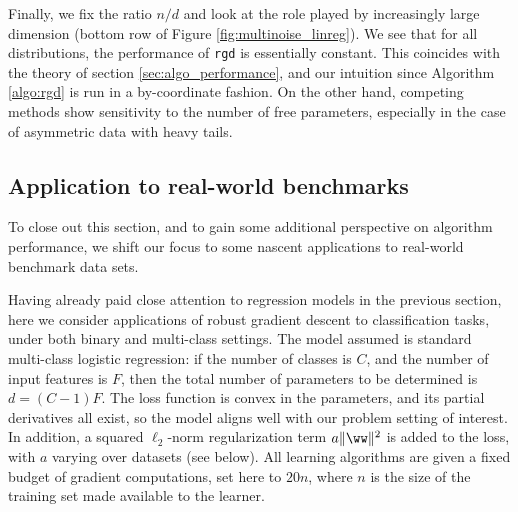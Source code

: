 \documentclass[11pt,oneside]{article}
\theoremstyle{definition} \newtheorem{defn}{Definition}       %
\theoremstyle{plain} \newtheorem{prop}[defn]{Proposition}           %
\theoremstyle{plain} \newtheorem{thm}[defn]{Theorem}                %
\theoremstyle{plain} \newtheorem{lem}[defn]{Lemma}                  %
\theoremstyle{plain} \newtheorem{cor}[defn]{Corollary}              %
\theoremstyle{remark} \newtheorem{rmk}[defn]{Remark}                %
\theoremstyle{remark} \newtheorem{ex}[defn]{Example}                %
\begin{document}
Finally, we fix the ratio $n/d$ and look at the role played by increasingly large dimension (bottom row of Figure \ref{fig:multinoise_linreg}). We see that for all distributions, the performance of \texttt{rgd} is essentially constant. This coincides with the theory of section \ref{sec:algo_performance}, and our intuition since Algorithm \ref{algo:rgd} is run in a by-coordinate fashion. On the other hand, competing methods show sensitivity to the number of free parameters, especially in the case of asymmetric data with heavy tails.


\subsection{Application to real-world benchmarks}\label{sec:tests_real}

To close out this section, and to gain some additional perspective on algorithm performance, we shift our focus to some nascent applications to real-world benchmark data sets.


Having already paid close attention to regression models in the previous section, here we consider applications of robust gradient descent to classification tasks, under both binary and multi-class settings. The model assumed is standard multi-class logistic regression: if the number of classes is $C$, and the number of input features is $F$, then the total number of parameters to be determined is $d = (C-1)F$. The loss function is convex in the parameters, and its partial derivatives all exist, so the model aligns well with our problem setting of interest. In addition, a squared $\ell_{2}$-norm regularization term $a \|\ww\|^{2}$ is added to the loss, with $a$ varying over datasets (see below). All learning algorithms are given a fixed budget of gradient computations, set here to $20n$, where $n$ is the size of the training set made available to the learner.
\end{document}
